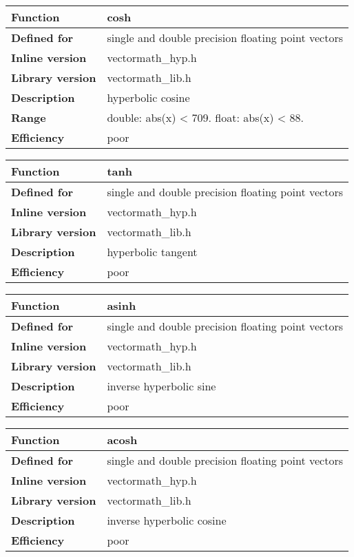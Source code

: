 \documentclass[vcl_manual.tex]{subfiles}
\begin{document}
\begin{tabular}{|p{30mm}|p{120mm}|}
\hline
\bfseries Function & cosh \\ \hline
\bfseries Defined for & single and double precision floating point vectors \\ \hline
\bfseries Inline version & vectormath\_hyp.h \\ \hline
\bfseries Library version & vectormath\_lib.h \\ \hline
\bfseries Description & hyperbolic cosine \\ \hline
\bfseries Range & double: abs(x) \textless{} 709. float: abs(x) \textless{} 88. \\ \hline
\bfseries Efficiency & poor \\ \hline
\end{tabular}


\begin{tabular}{|p{30mm}|p{120mm}|}
\hline
\bfseries Function & tanh \\ \hline
\bfseries Defined for & single and double precision floating point vectors \\ \hline
\bfseries Inline version & vectormath\_hyp.h \\ \hline
\bfseries Library version & vectormath\_lib.h \\ \hline
\bfseries Description & hyperbolic tangent \\ \hline
\bfseries Efficiency & poor \\ \hline
\end{tabular}


\begin{tabular}{|p{30mm}|p{120mm}|}
\hline
\bfseries Function & asinh \\ \hline
\bfseries Defined for & single and double precision floating point vectors \\ \hline
\bfseries Inline version & vectormath\_hyp.h \\ \hline
\bfseries Library version & vectormath\_lib.h \\ \hline
\bfseries Description & inverse hyperbolic sine \\ \hline
\bfseries Efficiency & poor \\ \hline
\end{tabular}


\begin{tabular}{|p{30mm}|p{120mm}|}
\hline
\bfseries Function & acosh \\ \hline
\bfseries Defined for & single and double precision floating point vectors \\ \hline
\bfseries Inline version & vectormath\_hyp.h \\ \hline
\bfseries Library version & vectormath\_lib.h \\ \hline
\bfseries Description & inverse hyperbolic cosine \\ \hline
\bfseries Efficiency & poor \\ \hline
\end{tabular}
\end{document}
